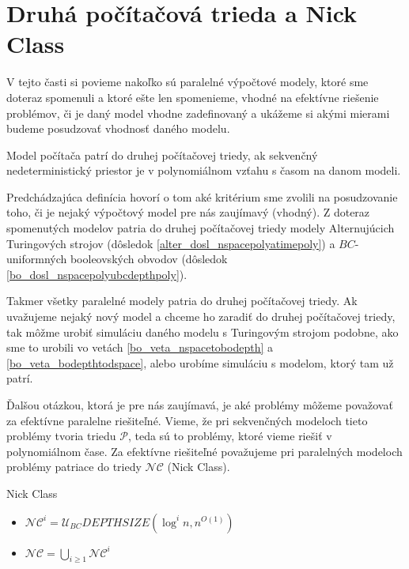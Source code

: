 {\section{Druhá počítačová trieda a Nick Class}

V tejto časti si povieme nakoľko sú paralelné výpočtové modely, ktoré sme doteraz spomenuli a ktoré
ešte len spomenieme, vhodné na efektívne riešenie problémov, či je daný model vhodne zadefinovaný a
ukážeme si akými mierami budeme posudzovať vhodnosť daného modelu.

\begin{definicia}
Model počítača patrí do druhej počítačovej triedy, ak sekvenčný nedeterministický
priestor je v polynomiálnom vzťahu s časom na danom modeli.
\end{definicia}

Predchádzajúca definícia hovorí o tom aké kritérium sme zvolili na posudzovanie toho, či je nejaký
výpočtový model pre nás zaujímavý (vhodný). Z doteraz spomenutých modelov patria do druhej
počítačovej triedy modely Alternujúcich Turingových strojov (dôsledok
\ref{alter_dosl_nspacepolyatimepoly}) a $BC$-uniformných booleovských obvodov (dôsledok
\ref{bo_dosl_nspacepolyubcdepthpoly}).

Takmer všetky paralelné modely patria do druhej počítačovej triedy. Ak uvažujeme nejaký nový model
a chceme ho zaradiť do druhej počítačovej triedy, tak môžme urobiť simuláciu daného modelu s
Turingovým strojom podobne, ako sme to urobili vo vetách \ref{bo_veta_nspacetobodepth} a
\ref{bo_veta_bodepthtodspace}, alebo urobíme simuláciu s modelom, ktorý tam už patrí.

Ďalšou otázkou, ktorá je pre nás zaujímavá, je aké problémy môžeme považovať za efektívne paralelne
riešiteľné. Vieme, že pri sekvenčných modeloch tieto problémy tvoria triedu $\mathcal{P}$, teda sú
to problémy, ktoré vieme riešiť v polynomiálnom čase. Za efektívne riešiteľné považujeme pri
paralelných modeloch problémy patriace do triedy $\mathcal{NC}$ (Nick Class).

\pagebreak

\begin{definicia}
Nick Class
\begin{itemize}
  \item $\mathcal{NC}^i=\mathcal{U}_{BC}DEPTHSIZE(\log^i n,n^{O(1)})$
  \item $\mathcal{NC}=\bigcup\limits_{i\geq 1} \mathcal{NC}^i$
\end{itemize}
\end{definicia}

}
